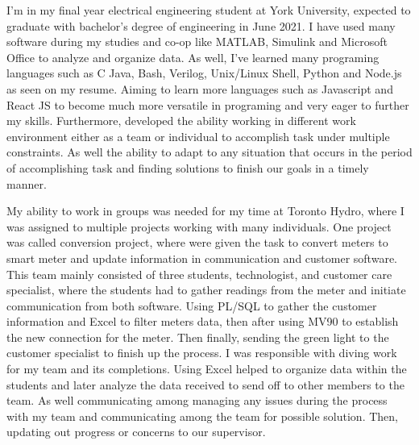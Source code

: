 \documentclass[11pt, a4paper]{awesome-cv} %
\begin{document}
\makecvheader %


\makelettertitle %


\begin{cvletter}


\tab I'm in my final year electrical engineering student at York University, expected to graduate with bachelor’s degree of engineering in June 2021. I have used many software during my studies and co-op like MATLAB, Simulink and Microsoft Office to analyze and organize data. As well, I've learned many programing languages such as C Java, Bash, Verilog, Unix/Linux Shell, Python and Node.js as seen on my resume. Aiming to learn more languages such as Javascript and React JS to become much more versatile in programing and very eager to further my skills. Furthermore, developed the ability working in different work environment either as a team or individual to accomplish task under multiple constraints. As well the ability to adapt to any situation that occurs in the period of accomplishing task and finding solutions to finish our goals in a timely manner.  

\tab My ability to work in groups was needed for my time at Toronto Hydro, where I was assigned to multiple projects working with many individuals. One project was called conversion project, where were given the task to convert meters to smart meter and update information in communication and customer software. This team mainly consisted of three students, technologist, and customer care specialist, where the students had to gather readings from the meter and initiate communication from both software. Using PL/SQL to gather the customer information and Excel to filter meters data, then after using MV90 to establish the new connection for the meter. Then finally, sending the green light to the customer specialist to finish up the process. I was responsible with diving work for my team and its completions. Using Excel helped to organize data within the students and later analyze the data received to send off to other members to the team. As well communicating among managing any issues during the process with my team and communicating among the team for possible solution. Then, updating out progress or concerns to our supervisor.


\end{cvletter}
\end{document}
